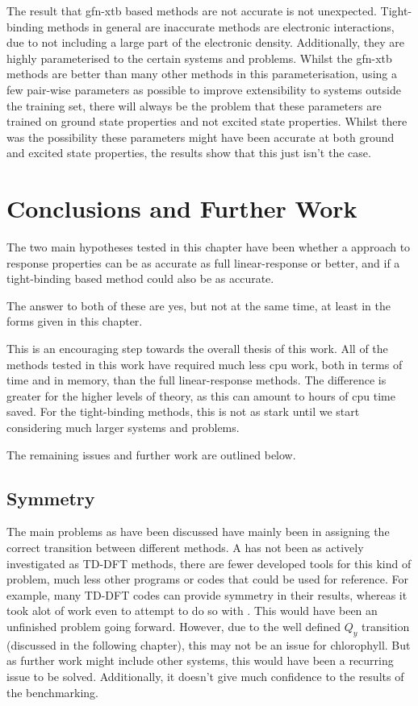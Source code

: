 The result that gfn-xtb based methods are not accurate is not unexpected. Tight-binding
methods in general are inaccurate methods are electronic interactions, due to not
including a large part of the electronic density. Additionally, they are highly
parameterised to the certain systems and problems. Whilst the gfn-xtb methods are
better than many other methods in this parameterisation, using a few pair-wise
parameters as possible to improve extensibility to systems outside the training
set, there will always be the problem that these parameters are trained on ground
state properties and not excited state properties. Whilst there was the possibility 
these parameters might have been accurate at both ground and excited state properties,
the results show that this just isn't the case.

\section{Conclusions and Further Work}
The two main hypotheses tested in this chapter have been whether a \dscf approach
to response properties can be as accurate as full linear-response or better, and
if a tight-binding based method could also be as accurate.

The answer to both of these are yes, but not at the same time, at least in the 
forms given in this chapter.

This is an encouraging step towards the overall thesis of this work. All of the
\dscf methods tested in this work have required much less cpu work, both in terms
of time and in memory, than the full linear-response methods. The difference is 
greater for the higher levels of theory, as this can amount to hours of cpu time
saved. For the tight-binding methods, this is not as stark until we start considering
much larger systems and problems.

The remaining issues and further work are outlined below.

\subsection{Symmetry}
\label{sec:dscf_symmetry}

The main problems as have been discussed have mainly been in assigning the correct
transition between different methods. A \dscf has not been as actively investigated
as TD-DFT methods, there are fewer developed tools for this kind of problem, much
less other programs or codes that could be used for reference. For example, many
TD-DFT codes can provide symmetry in their results, whereas it took alot of work
even to attempt to do so with \dscf. This would have been an unfinished problem 
going forward. However, due to the well defined $Q_y$ transition (discussed in the
following chapter), this may not be an issue for chlorophyll. But as further
work might include other systems, this would have been a recurring issue to be
solved. Additionally, it doesn't give much confidence to the results of the benchmarking.


